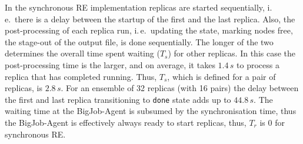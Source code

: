 \documentclass{rspublic}
\newcommand{\alnote}[1]{ {\textcolor{blue} { ***andre: #1 }}}
\newcommand{\athotanote}[1]{ {\textcolor{green} { ***athota: #1 }}}
\newcommand{\alnote}[1]{}
\newcommand{\athotanote}[1]{}
\begin{document}
In the synchronous RE implementation replicas are started
sequentially, i.\,e.\ there is a delay between the startup of the
first and the last replica. Also, the post-processing of each replica
run, i.\,e.\ updating the state, marking nodes free, the stage-out of
the output file, is done sequentially. The longer of the two
determines the overall time spent waiting ($T_s$) for other replicas.
In this case the post-processing time is the larger, and on average,
it takes $1.4\,s$
to process a replica that has completed running. Thus, $T_{s}$, which
is defined for a pair of replicas, is $2.8\,s$. For an ensemble of 32
replicas (with 16 pairs) the delay between the first and last replica
transitioning to \texttt{done} state adds up to $44.8\,s$.  The
waiting time at the BigJob-Agent is subsumed by the synchronisation
time, thus the BigJob-Agent is effectively always ready to start
replicas, thus, $T_r$ is 0 for synchronous RE.







\end{document}
